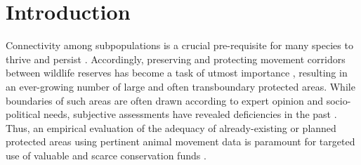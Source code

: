 \documentclass[abstract=on,10pt,a4paper,bibliography=totocnumbered]{article}
\begin{document}
\newpage


\linenumbers

\section{Introduction}
Connectivity among subpopulations is a crucial pre-requisite for many species to
thrive and persist \citep{Fahrig.2003}. Accordingly, preserving and protecting
movement corridors between wildlife reserves has become a task of utmost
 importance \citep{Doerr.2011, Rudnick.2012},
resulting in an ever-growing number of large and often transboundary protected
areas. While boundaries of such areas are often drawn according to expert
opinion and socio-political needs, subjective assessments have revealed
deficiencies in the past \citep{Clevenger.2002, Pullinger.2010}. Thus, an
empirical evaluation of the adequacy of already-existing or planned protected
areas using pertinent animal movement data is paramount for targeted use of
valuable and scarce conservation funds \citep{Pullinger.2010}.
\end{document}
